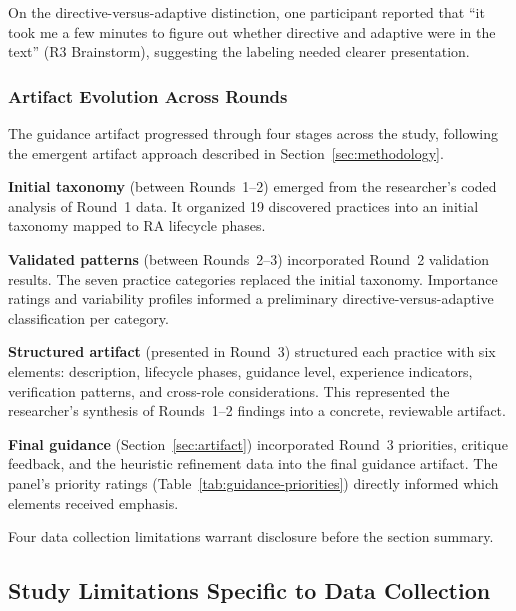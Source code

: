 On the directive-versus-adaptive distinction, one participant reported that ``it
took me a few minutes to figure out whether directive and adaptive were in the
text'' (R3 Brainstorm), suggesting the labeling needed clearer presentation.

\subsubsection{Artifact Evolution Across Rounds}\label{subsubsec:artifact-evolution}

The guidance artifact progressed through four stages across the study, following
the emergent artifact approach described in Section~\ref{sec:methodology}.

\textbf{Initial taxonomy} (between Rounds~1--2) emerged from the researcher's
coded analysis of Round~1 data. It organized 19 discovered practices into an
initial taxonomy mapped to RA lifecycle phases.

\textbf{Validated patterns} (between Rounds~2--3) incorporated Round~2 validation
results. The seven practice categories replaced the initial taxonomy. Importance
ratings and variability profiles informed a preliminary directive-versus-adaptive
classification per category.

\textbf{Structured artifact} (presented in Round~3) structured each practice with
six elements: description, lifecycle phases, guidance level, experience
indicators, verification patterns, and cross-role considerations. This
represented the researcher's synthesis of Rounds~1--2 findings into a concrete,
reviewable artifact.

\textbf{Final guidance} (Section~\ref{sec:artifact}) incorporated Round~3
priorities, critique feedback, and the heuristic refinement data into the final
guidance artifact. The panel's priority ratings
(Table~\ref{tab:guidance-priorities}) directly informed which elements received
emphasis.

Four data collection limitations warrant disclosure before the section summary.

\subsection{Study Limitations Specific to Data Collection}\label{subsec:data-limitations}


